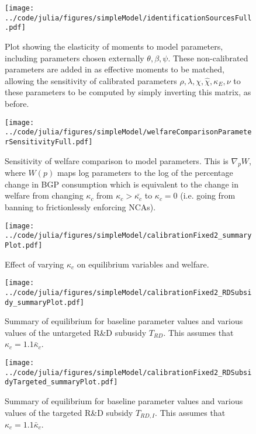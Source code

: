 \documentclass[11pt,english]{article}
\theoremstyle{definition}
\begin{document}
\begin{figure}[]
	\centering
	\texttt{[image: ../code/julia/figures/simpleModel/identificationSourcesFull.pdf]}
	\caption{Plot showing the elasticity of moments to model parameters, including parameters chosen externally $\theta , \beta, \psi$. These non-calibrated parameters are added in as effective moments to be matched, allowing the sensitivity of calibrated parameters $\rho, \lambda, \chi, \hat{\chi}, \kappa_E, \nu$ to these parameters to be computed by simply inverting this matrix, as before.}
	\label{calibration_identificationSources_full}
\end{figure}

\begin{figure}[]
	\centering
	\texttt{[image: ../code/julia/figures/simpleModel/welfareComparisonParameterSensitivityFull.pdf]}
	\caption{Sensitivity of welfare comparison to model parameters. This is $\nabla_p W$, where $W(p)$ maps log parameters to the log of the percentage change in BGP consumption which is equivalent to the change in welfare from changing $\kappa_c$ from $\kappa_c > \bar{\kappa_c}$ to $\kappa_c = 0$ (i.e. going from banning to frictionlessly enforcing NCAs).}
	\label{welfareComparisonParameterSensitivityFull}
\end{figure}

\begin{figure}[]
	\centering
	\texttt{[image: ../code/julia/figures/simpleModel/calibrationFixed2\_summaryPlot.pdf]}
	\caption{Effect of varying $\kappa_c$ on equilibrium variables and welfare.}
	\label{calibration_summaryPlot}
\end{figure}

\begin{figure}[]
	\centering
	\texttt{[image: ../code/julia/figures/simpleModel/calibrationFixed2\_RDSubsidy\_summaryPlot.pdf]}
	\caption{Summary of equilibrium for baseline parameter values and various values of the untargeted R\&D subusidy $T_{RD}$. This assumes that $\kappa_c = 1.1 \bar{\kappa}_c$.}
	\label{calibration_RDSubsidy_summaryPlot}
\end{figure}

\begin{figure}[]
	\centering
	\texttt{[image: ../code/julia/figures/simpleModel/calibrationFixed2\_RDSubsidyTargeted\_summaryPlot.pdf]}
	\caption{Summary of equilibrium for baseline parameter values and various values of the targeted R\&D subsidy $T_{RD,I}$. This assumes that $\kappa_c = 1.1 \bar{\kappa}_c$.}
	\label{calibration_RDSubsidyTargeted_summaryPlot}
\end{figure}
\end{document}
